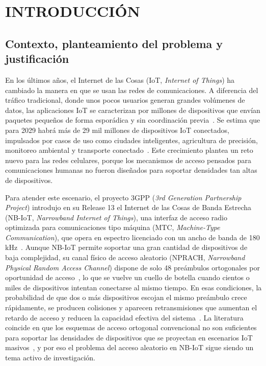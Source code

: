 \chapter{INTRODUCCIÓN}

\section{Contexto, planteamiento del problema y justificación}

En los últimos años, el Internet de las Cosas (IoT, \textit{Internet of Things}) ha cambiado
la manera en que se usan las redes de comunicaciones. A diferencia del tráfico tradicional,
donde unos pocos usuarios generan grandes volúmenes de datos, las aplicaciones IoT se
caracterizan por millones de dispositivos que envían paquetes pequeños de forma esporádica
y sin coordinación previa~\cite{ref1, ref2}. Se estima que para 2029 habrá más de 29 mil
millones de dispositivos IoT conectados, impulsados por casos de uso como ciudades
inteligentes, agricultura de precisión, monitoreo ambiental y transporte
conectado~\cite{ref3}. Este crecimiento plantea un reto nuevo para las redes celulares,
porque los mecanismos de acceso pensados para comunicaciones humanas no fueron diseñados
para soportar densidades tan altas de dispositivos.

Para atender este escenario, el proyecto 3GPP (\textit{3rd Generation Partnership Project})
introdujo en su Release 13 el Internet de las Cosas de Banda Estrecha (NB-IoT,
\textit{Narrowband Internet of Things}), una interfaz de
acceso radio optimizada para comunicaciones tipo máquina (MTC, \textit{Machine-Type
Communication}), que opera en espectro licenciado con un ancho de banda de
180\,kHz~\cite{ref3, ref7}. Aunque NB-IoT permite soportar una gran cantidad de dispositivos
de baja complejidad, su canal físico de acceso aleatorio (NPRACH, \textit{Narrowband Physical
Random Access Channel}) dispone de solo 48 preámbulos ortogonales por oportunidad de
acceso~\cite{ref7}, lo que se vuelve un cuello de botella cuando cientos o miles de
dispositivos intentan conectarse al mismo tiempo. En esas condiciones, la probabilidad de
que dos o más dispositivos escojan el mismo preámbulo crece rápidamente, se producen
colisiones y aparecen retransmisiones que aumentan el retardo de acceso y reducen la
capacidad efectiva del sistema~\cite{ref4, ref5}. La literatura coincide en que los
esquemas de acceso ortogonal convencional no son suficientes para soportar las densidades
de dispositivos que se proyectan en escenarios IoT masivos~\cite{ref4, ref5}, y por eso el
problema del acceso aleatorio en NB-IoT sigue siendo un tema activo de investigación.

